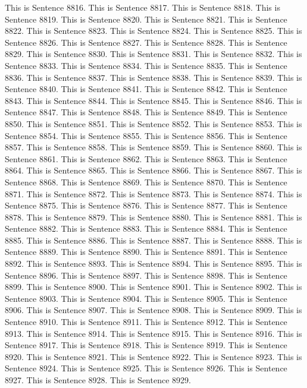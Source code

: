 \documentclass{article}
\begin{document}
This is Sentence 8816.
This is Sentence 8817.
This is Sentence 8818.
This is Sentence 8819.
This is Sentence 8820.
This is Sentence 8821.
This is Sentence 8822.
This is Sentence 8823.
This is Sentence 8824.
This is Sentence 8825.
This is Sentence 8826.
This is Sentence 8827.
This is Sentence 8828.
This is Sentence 8829.
This is Sentence 8830.
This is Sentence 8831.
This is Sentence 8832.
This is Sentence 8833.
This is Sentence 8834.
This is Sentence 8835.
This is Sentence 8836.
This is Sentence 8837.
This is Sentence 8838.
This is Sentence 8839.
This is Sentence 8840.
This is Sentence 8841.
This is Sentence 8842.
This is Sentence 8843.
This is Sentence 8844.
This is Sentence 8845.
This is Sentence 8846.
This is Sentence 8847.
This is Sentence 8848.
This is Sentence 8849.
This is Sentence 8850.
This is Sentence 8851.
This is Sentence 8852.
This is Sentence 8853.
This is Sentence 8854.
This is Sentence 8855.
This is Sentence 8856.
This is Sentence 8857.
This is Sentence 8858.
This is Sentence 8859.
This is Sentence 8860.
This is Sentence 8861.
This is Sentence 8862.
This is Sentence 8863.
This is Sentence 8864.
This is Sentence 8865.
This is Sentence 8866.
This is Sentence 8867.
This is Sentence 8868.
This is Sentence 8869.
This is Sentence 8870.
This is Sentence 8871.
This is Sentence 8872.
This is Sentence 8873.
This is Sentence 8874.
This is Sentence 8875.
This is Sentence 8876.
This is Sentence 8877.
This is Sentence 8878.
This is Sentence 8879.
This is Sentence 8880.
This is Sentence 8881.
This is Sentence 8882.
This is Sentence 8883.
This is Sentence 8884.
This is Sentence 8885.
This is Sentence 8886.
This is Sentence 8887.
This is Sentence 8888.
This is Sentence 8889.
This is Sentence 8890.
This is Sentence 8891.
This is Sentence 8892.
This is Sentence 8893.
This is Sentence 8894.
This is Sentence 8895.
This is Sentence 8896.
This is Sentence 8897.
This is Sentence 8898.
This is Sentence 8899.
This is Sentence 8900.
This is Sentence 8901.
This is Sentence 8902.
This is Sentence 8903.
This is Sentence 8904.
This is Sentence 8905.
This is Sentence 8906.
This is Sentence 8907.
This is Sentence 8908.
This is Sentence 8909.
This is Sentence 8910.
This is Sentence 8911.
This is Sentence 8912.
This is Sentence 8913.
This is Sentence 8914.
This is Sentence 8915.
This is Sentence 8916.
This is Sentence 8917.
This is Sentence 8918.
This is Sentence 8919.
This is Sentence 8920.
This is Sentence 8921.
This is Sentence 8922.
This is Sentence 8923.
This is Sentence 8924.
This is Sentence 8925.
This is Sentence 8926.
This is Sentence 8927.
This is Sentence 8928.
This is Sentence 8929.
\end{document}
